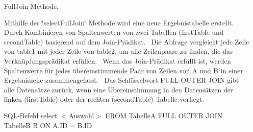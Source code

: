 Full\+Join Methode. 

Mithilfe der \char`\"{}select\+Full\+Join\char`\"{} Methode wird eine neue Ergebnistabelle erstellt.~\newline
 Durch Kombinieren von Spaltenwerten von zwei Tabellen (first\+Table und second\+Table) basierend auf dem Join-\/\+Prädikat.~\newline
 Die Abfrage vergleicht jede Zeile von table1 mit jeder Zeile von table2, um alle Zeilenpaare zu finden, die das Verknüpfungsprädikat erfüllen.~\newline
 Wenn das Join-\/\+Prädikat erfüllt ist, werden Spaltenwerte für jedes übereinstimmende Paar von Zeilen von A und B in einer Ergebniszeile zusammengefasst.~\newline
 Das Schlüsselwort F\+U\+LL O\+U\+T\+ER J\+O\+IN gibt alle Datensätze zurück, wenn eine Übereinstimmung in den Datensätzen der linken (first\+Table) oder der rechten (second\+Table) Tabelle vorliegt.~\newline


S\+Q\+L-\/\+Befehl select $<$\+Auswahl$>$ F\+R\+OM TabelleA F\+U\+LL O\+U\+T\+ER J\+O\+IN TabelleB B ON A.\+ID = B.\+ID


